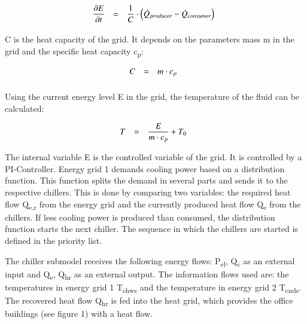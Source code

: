 \documentclass[3p,times,procedia,twocolumn,twoside]{elsarticle}
\begin{document}
\begin{equation}
\begin{array}{@{}lcl}

\displaystyle 
\frac{\partial E}{\partial t} &=& 
\displaystyle 
\frac
{1}
{C}
\cdot \left
(\dot{Q}_{producer} - \dot{Q}_{consumer}\right)
\\[6pt]

\end{array}\vspace*{-12pt}
\end{equation}

C is the heat capacity of the grid. It depends on the parameters mass m in the grid and the specific heat capacity c\textsubscript{p}:

\begin{equation}
\begin{array}{@{}lcl}

\displaystyle 
C &=& 
\displaystyle 
m \cdot c_p
\\[6pt]

\end{array}\vspace*{-12pt}
\end{equation}

Using the current energy level E in the grid, the temperature of the fluid can be calculated:

\begin{equation}
\begin{array}{@{}lcl}

\displaystyle 
T &=& 
\displaystyle 
\frac{E}
{m \cdot c_p}
+ T_0
\\[6pt]

\end{array}\vspace*{-12pt}
\end{equation}

The internal variable E is the controlled variable of the grid. It is controlled by a PI-Controller. Energy grid 1 demands cooling power based on a distribution function. This function splits the demand in several parts and sends it to the respective chillers. This is done by comparing two variables: the required heat flow Q\textsubscript{e,r} from the energy grid and the currently produced heat flow Q\textsubscript{e} from the chillers. If less cooling power is produced than consumed, the distribution function starts the next chiller. The sequence in which the chillers are started is defined in the priority list. 

The chiller submodel receives the following energy flows: P\textsubscript{el}, Q\textsubscript{c} as an external input and Q\textsubscript{e}, Q\textsubscript{hr} as an external output. The information flows used are: the temperatures in energy grid 1 T\textsubscript{chws} and the temperature in energy grid 2 T\textsubscript{cnds}. The recovered heat flow Q\textsubscript{hr} is fed into the heat grid, which provides the office buildings (see figure 1) with a heat flow.
\end{document}
